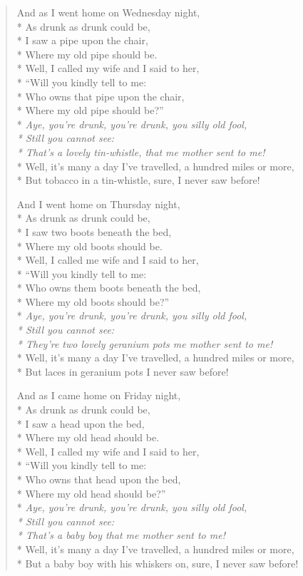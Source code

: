 \documentclass[9pt,twoside]{extarticle}
\newenvironment{xverse}{
	\begin{verse}
	\fontsize{8.5}{10.5}\selectfont
}{
	\end{verse}
}
\begin{document}
\begin{xverse}
And as I went home on Wednesday night, \\*
As drunk as drunk could be, \\*
I saw a pipe upon the chair, \\*
Where my old pipe should be. \\*
Well, I called my wife and I said to her, \\*
“Will you kindly tell to me: \\*
Who owns that pipe upon the chair, \\*
Where my old pipe should be?” \\*
\textit{Aye, you’re drunk, you’re drunk, you silly old fool, \\*
Still you cannot see: \\*
That’s a lovely tin-whistle, that me mother sent to me!} \\*
Well, it’s many a day I’ve travelled, a hundred miles or more, \\*
But tobacco in a tin-whistle, sure, I never saw before!

And I went home on Thursday night, \\*
As drunk as drunk could be, \\*
I saw two boots beneath the bed, \\*
Where my old boots should be. \\*
Well, I called me wife and I said to her, \\*
“Will you kindly tell to me: \\*
Who owns them boots beneath the bed, \\*
Where my old boots should be?” \\*
\textit{Aye, you’re drunk, you’re drunk, you silly old fool, \\*
Still you cannot see: \\*
They’re two lovely geranium pots me mother sent to me!} \\*
Well, it’s many a day I’ve travelled, a hundred miles or more, \\*
But laces in geranium pots I never saw before!

And as I came home on Friday night, \\*
As drunk as drunk could be, \\*
I saw a head upon the bed, \\*
Where my old head should be. \\*
Well, I called my wife and I said to her, \\*
“Will you kindly tell to me: \\*
Who owns that head upon the bed, \\*
Where my old head should be?” \\*
\textit{Aye, you’re drunk, you’re drunk, you silly old fool, \\*
Still you cannot see: \\*
That’s a baby boy that me mother sent to me!} \\*
Well, it’s many a day I’ve travelled, a hundred miles or more, \\*
But a baby boy with his whiskers on, sure, I never saw before!
\end{xverse}
\end{document}
